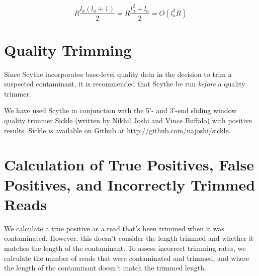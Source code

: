 \documentclass{bioinfo}
\begin{document}
$$ R \frac{l_a(l_a + 1)}{2} = R \frac{l_a^2 + l_a}{2} = O(l_a^2 R)$$

\section{Quality Trimming}

Since Scythe incorporates base-level quality data in the decision to
trim a suspected contaminant, it is recommended that Scythe be run
\emph{before} a quality trimmer.

We have used Scythe in conjunction with the 5'- and 3'-end sliding
window quality trimmer Sickle (written by Nikhil Joshi and Vince
Buffalo) with positive results. Sickle is available on Github at
\href{http://github.com/najoshi/sickle}{http://github.com/najoshi/sickle}.

\section{Calculation of True Positives, False Positives, and
  Incorrectly Trimmed Reads}

We calculate a true positive as a read that's been trimmed when it was
contaminated. However, this doesn't consider the length trimmed and
whether it matches the length of the contaminant. To assess incorrect
trimming rates, we calculate the number of reads that were
contaminated and trimmed, and where the length of the contaminant
doesn't match the trimmed length.



\end{document}
